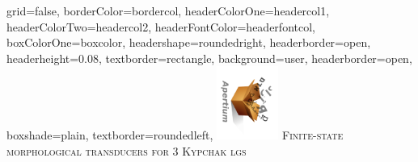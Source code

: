 \documentclass[a0paper,fontscale=0.3]{baposter}  %
\begin{document}
	\setlength{\pdfpageheight}{\paperheight}
	\setlength{\pdfpagewidth}{\paperwidth}

	\background{{
	}}



	\begin{poster}{
			grid=false,
			borderColor=bordercol,
			headerColorOne=headercol1,
			headerColorTwo=headercol2,
			headerFontColor=headerfontcol,
			boxColorOne=boxcolor,
			headershape=roundedright,
  headerborder=open,
  headerheight=0.08\textheight,
			textborder=rectangle,
			background=user,
			headerborder=open,
			boxshade=plain,
			textborder=roundedleft,
		}{
			\hspace{-2em}\includegraphics[angle=90,height=6.5em,bb=0 0 203 242]{apertium5a}
		}{
			{\vspace{0pt}\hspace{-2.2ex}
			{\titlefont \textsc{Finite-state morphological transducers for 3 Kypchak lgs}}}
		}{

}
\end{poster}
\end{document}
